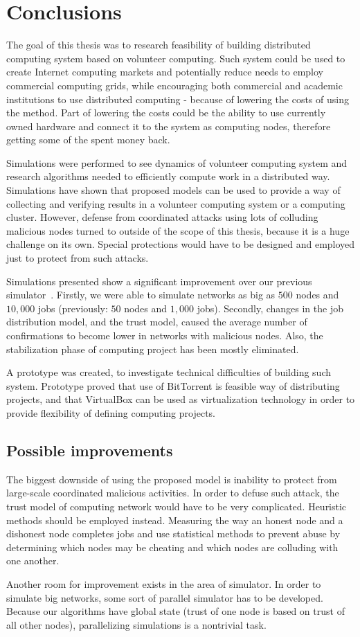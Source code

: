 \chapter{Conclusions}

The goal of this thesis was to research feasibility of building distributed computing system based on volunteer computing. Such system could be used to create Internet computing markets and potentially reduce needs to employ commercial computing grids, while encouraging both commercial and academic institutions to use distributed computing - because of lowering the costs of using the method. Part of lowering the costs could be the ability to use currently owned hardware and connect it to the system as computing nodes, therefore getting some of the spent money back.

Simulations were performed to see dynamics of volunteer computing system and research algorithms needed to efficiently compute work in a distributed way. Simulations have shown that proposed models can be used to provide a way of collecting and verifying results in a volunteer computing system or a computing cluster. However, defense from coordinated attacks using lots of colluding malicious nodes turned to outside of the scope of this thesis, because it is a huge challenge on its own. Special protections would have to be designed and employed just to protect from such attacks.

Simulations presented show a significant improvement over our previous simulator~\cite{zochniakreliable}. Firstly, we were able to simulate networks as big as $500$ nodes and $10,000$ jobs (previously: $50$ nodes and $1,000$ jobs). Secondly, changes in the job distribution model, and the trust model, caused the average number of confirmations to become lower in networks with malicious nodes. Also, the stabilization phase of computing project has been mostly eliminated.

A prototype was created, to investigate technical difficulties of building such system. Prototype proved that use of BitTorrent is feasible way of distributing projects, and that VirtualBox can be used as virtualization technology in order to provide flexibility of defining computing projects. 

\section*{Possible improvements}

The biggest downside of using the proposed model is inability to protect from large-scale coordinated malicious activities. In order to defuse such attack, the trust model of computing network would have to be very complicated. Heuristic methods should be employed instead. Measuring the way an honest node and a dishonest node completes jobs and use statistical methods to prevent abuse by determining which nodes may be cheating and which nodes are colluding with one another.

Another room for improvement exists in the area of simulator. In order to simulate big networks, some sort of parallel simulator has to be developed. Because our algorithms have global state (trust of one node is based on trust of all other nodes), parallelizing simulations is a nontrivial task.